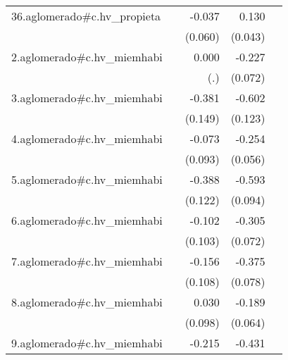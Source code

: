 {\begin{longtable}{l*{4}{D{.}{.}{-1}}}
\addlinespace
36.aglomerado#c.hv\_propieta&                     &      -0.037         &       0.130\sym{**} &                     \\
            &                     &     (0.060)         &     (0.043)         &                     \\
\addlinespace
2.aglomerado#c.hv\_miemhabi&                     &       0.000         &      -0.227\sym{**} &                     \\
            &                     &         (.)         &     (0.072)         &                     \\
\addlinespace
3.aglomerado#c.hv\_miemhabi&                     &      -0.381\sym{*}  &      -0.602\sym{***}&                     \\
            &                     &     (0.149)         &     (0.123)         &                     \\
\addlinespace
4.aglomerado#c.hv\_miemhabi&                     &      -0.073         &      -0.254\sym{***}&                     \\
            &                     &     (0.093)         &     (0.056)         &                     \\
\addlinespace
5.aglomerado#c.hv\_miemhabi&                     &      -0.388\sym{**} &      -0.593\sym{***}&                     \\
            &                     &     (0.122)         &     (0.094)         &                     \\
\addlinespace
6.aglomerado#c.hv\_miemhabi&                     &      -0.102         &      -0.305\sym{***}&                     \\
            &                     &     (0.103)         &     (0.072)         &                     \\
\addlinespace
7.aglomerado#c.hv\_miemhabi&                     &      -0.156         &      -0.375\sym{***}&                     \\
            &                     &     (0.108)         &     (0.078)         &                     \\
\addlinespace
8.aglomerado#c.hv\_miemhabi&                     &       0.030         &      -0.189\sym{**} &                     \\
            &                     &     (0.098)         &     (0.064)         &                     \\
\addlinespace
9.aglomerado#c.hv\_miemhabi&                     &      -0.215         &      -0.431\sym{***}&                     \\

\end{longtable}}
